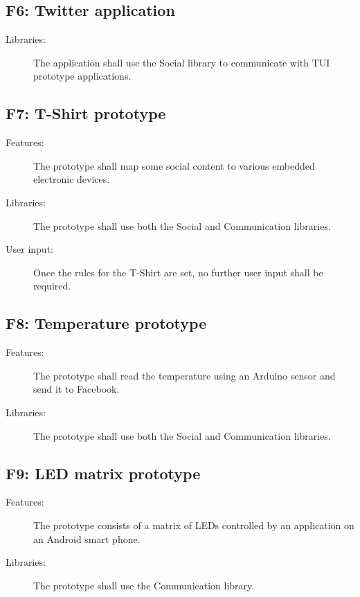 \subsection{F6: Twitter application}
\begin{description}
	\item[Libraries:] The application shall use the Social library to
	communicate with TUI prototype applications.
\end{description}

\subsection{F7: T-Shirt prototype}
\begin{description}
	\item[Features:] The prototype shall map some social content to various
	embedded electronic devices.
	\item[Libraries:] The prototype shall use both the Social and Communication
	libraries.
	\item[User input:] Once the rules for the T-Shirt are set, no further user
	input shall be required.
\end{description}

\subsection{F8: Temperature prototype}
\begin{description}
	\item[Features:] The prototype shall read the temperature using an Arduino
	sensor and send it to Facebook.
	\item[Libraries:] The prototype shall use both the Social and Communication
	libraries.
\end{description}
	
	\subsection{F9: LED matrix prototype}
	\begin{description}
		\item[Features:] The prototype consists of a matrix of LEDs controlled by an application on 
		an Android smart phone.
		\item[Libraries:] The prototype shall use the Communication library.
		\item[]
	\end{description}


